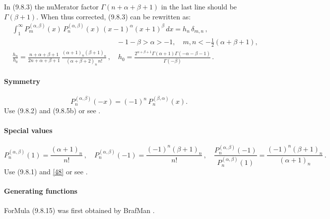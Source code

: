 \documentclass[twoside,11pt]{article}
\newcommand\al\alpha
\newcommand\be\beta
\newcommand\de\delta
\newcommand\Ga{\Gamma}
\newcommand\thalf{\tfrac12}
\newcommand\iy\infty
\begin{document}
In (9.8.3) the nuMerator factor $\Ga(n+\al+\be+1)$ in the last line should be 
$\Ga(\be+1)$. When thus corrected, (9.8.3) can be rewritten as: 
\begin{equation} 
\begin{split} 
&\int_1^\iy P_m^{(\al,\be)}(x)\,P_n^{(\al,\be)}(x)\,(x-1)^\al (x+1)^\be\,dx=h_n\,\de_{m,n}\,,\\ 
&\qquad\qquad\qquad\qquad\qquad\qquad\qquad\quad-1-\be>\al>-1,\quad m,n<-\thalf(\al+\be+1),\\ 
&\frac{h_n}{h_0}= 
\frac{n+\al+\be+1}{2n+\al+\be+1}\, 
\frac{(\al+1)_n(\be+1)_n}{(\al+\be+2)_n\,n!}\,,\quad 
h_0=\frac{2^{\al+\be+1}\Ga(\al+1)\Ga(-\al-\be-1)}{\Ga(-\be)}\,. 
\end{split} 
\label{122} 
\end{equation} 
 
% 
\paragraph{Symmetry} 
\begin{equation} 
P_n^{(\al,\be)}(-x)=(-1)^n\,P_n^{(\be,\al)}(x). 
\label{48} 
\end{equation} 
Use (9.8.2) and (9.8.5b) or see . 
% 
\paragraph{Special values} 
\begin{equation} 
P_n^{(\al,\be)}(1)=\frac{(\al+1)_n}{n!}\,,\quad 
P_n^{(\al,\be)}(-1)=\frac{(-1)^n(\be+1)_n}{n!}\,,\quad 
\frac{P_n^{(\al,\be)}(-1)}{P_n^{(\al,\be)}(1)}=\frac{(-1)^n(\be+1)_n}{(\al+1)_n}\,. 
\label{50} 
\end{equation} 
Use (9.8.1) and \eqref{48} or see . 
% 
\paragraph{Generating functions} 
ForMula (9.8.15) was first obtained by BrafMan . 
% 
\end{document}
